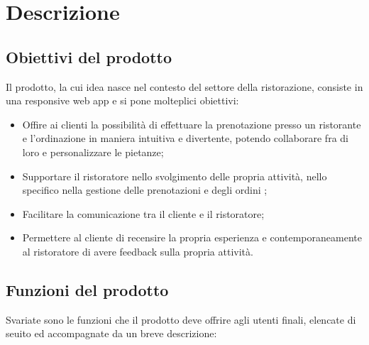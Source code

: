 \section{Descrizione }
\subsection{Obiettivi del prodotto}

Il prodotto, la cui idea nasce nel contesto del settore della ristorazione,
 consiste in una responsive web app e si pone molteplici obiettivi:
\begin{itemize}
    \item Offire ai clienti la possibilità di effettuare la prenotazione presso un ristorante
     e l'ordinazione in maniera intuitiva e divertente, potendo collaborare fra di loro e personalizzare le pietanze;
    \item Supportare il ristoratore nello svolgimento delle propria attività, nello specifico nella gestione delle prenotazioni e 
    degli ordini ;
    \item Facilitare la comunicazione tra il cliente e il ristoratore;
    \item Permettere al cliente di recensire la propria esperienza e contemporaneamente al ristoratore di avere
    feedback sulla propria attività.
\end{itemize}

\subsection{Funzioni del prodotto}

Svariate sono le funzioni che il prodotto deve offrire agli utenti finali,
elencate di seuito ed accompagnate da un breve descrizione:

